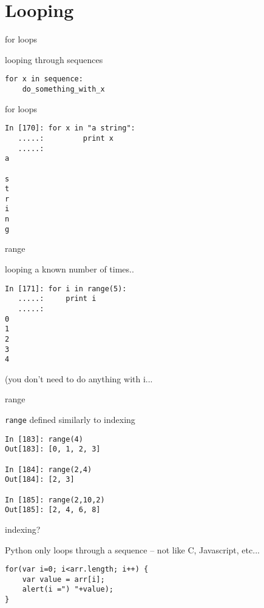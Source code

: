 \documentclass{beamer}
\begin{document}
\section{Looping}

\begin{frame}[fragile]{for loops}

{\Large looping through sequences

\begin{verbatim}
for x in sequence:
    do_something_with_x
\end{verbatim}
}
\end{frame}

\begin{frame}[fragile]{for loops}

\begin{verbatim}
In [170]: for x in "a string":
   .....:         print x
   .....:     
a
 
s
t
r
i
n
g
\end{verbatim}
\end{frame}

\begin{frame}[fragile]{range}

{\Large looping a known number of times..}

\begin{verbatim}
In [171]: for i in range(5):
   .....:     print i
   .....:     
0
1
2
3
4
\end{verbatim}
(you don't need to do anything with i...
\end{frame}

\begin{frame}[fragile]{range}

{\Large \verb|range| defined similarly to indexing}

\begin{verbatim}
In [183]: range(4)
Out[183]: [0, 1, 2, 3]

In [184]: range(2,4)
Out[184]: [2, 3]

In [185]: range(2,10,2)
Out[185]: [2, 4, 6, 8]
\end{verbatim}

\end{frame}

\begin{frame}[fragile]{indexing?}

{\Large Python only loops through a sequence -- not like C, Javascript, etc...}
\begin{verbatim}
for(var i=0; i<arr.length; i++) {
    var value = arr[i];
    alert(i =") "+value);
}
\end{verbatim}

\end{frame}
\end{document}
